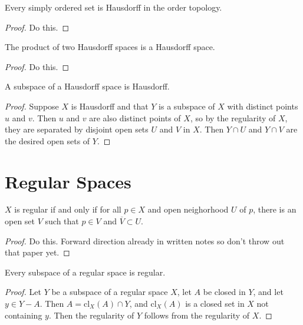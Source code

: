 \documentclass[10pt]{report}
\begin{document}
\begin{prop}
	Every simply ordered set is Hausdorff in the order topology.
\end{prop}
\begin{proof}
	{\color{red}Do this.}
\end{proof}

\begin{prop}
	The product of two Hausdorff spaces is a Hausdorff space.
\end{prop}
\begin{proof}
	{\color{red}Do this.}
\end{proof}

\begin{prop}
	A subspace of a Hausdorff space is Hausdorff.
\end{prop}
\begin{proof}
	Suppose $X$ is Hausdorff and that $Y$ is a subspace of $X$ with distinct points $u$ and $v$. Then $u$ and $v$ are also distinct points of $X$, so by the regularity of $X$, they are separated by disjoint open sets $U$ and $V$ in $X$. Then $Y \cap U$ and $Y \cap V$ are the desired open sets of $Y$.
\end{proof}


\section{Regular Spaces}

\begin{prop}
$X$ is regular if and only if for all $p \in X$ and open neighorhood $U$ of $p$, there is an open set $V$ such that $p \in V$ and $\overline{V}\subset U$.
\end{prop}
\begin{proof}
	{\color{red}Do this. Forward direction already in written notes so don't throw out that paper yet.}
\end{proof}

\begin{prop}
Every subspace of a regular space is regular.
\end{prop}
\begin{proof}
	Let $Y$ be a subspace of a regular space $X$, let $A$ be closed in $Y$, and let $y \in Y-A$. Then $A = \text{cl}_X(A) \cap Y$, and $\text{cl}_X(A)$ is a closed set in $X$ not containing $y$. Then the regularity of $Y$ follows from the regularity of $X$.
\end{proof}
\end{document}
